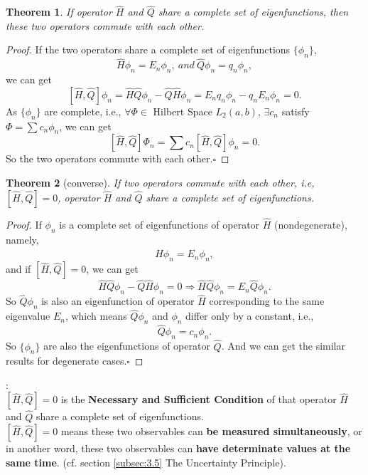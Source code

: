 \documentclass[12pt, 
]{article}
\newtheorem*{thm}{Theorem}
\newtheorem*{proof}{Proof}
\begin{document}
\begin{thm}
	If operator $\hat{H}$ and $\hat{Q}$ share a complete set of eigenfunctions, then these two operators commute with each other.
\end{thm}
\begin{proof}
	If the two operators share a complete set of eigenfunctions $\{\phi_n\}$,
	$$\hat{H}\phi_n=E_n\phi_n,~\textit{and}~\hat{Q}\phi_n=q_n\phi_n,$$
we can get 
	$$[\hat{H},\hat{Q}]\phi_n=\hat{H}\hat{Q}\phi_n-\hat{Q}\hat{H}\phi_n=E_nq_n\phi_n-q_nE_n\phi_n=0.$$
As $\{\phi_n\}$ are complete, i.e., $\forall\varPhi\in$ Hilbert Space $L_2(a,b)$, $\exists c_n$ satisfy $\varPhi=\sum c_n\phi_n$, we can get
	$$[\hat{H},\hat{Q}]\varPhi_n=\sum c_n[\hat{H},\hat{Q}]\phi_n=0.$$
	So the two operators commute with each other.\hfill$\square$

\end{proof}

\begin{thm}[converse]
	If two operators commute with each other, i.e, $[\hat{H}, \hat{Q}]=0$, operator $\hat{H}$ and $\hat{Q}$ share a complete set of eigenfunctions.
\end{thm}
\begin{proof}
	If ${\phi_n}$ is a complete set of eigenfunctions of operator $\hat{H}$ (nondegenerate), namely,
	$$\hat{H}\phi_n=E_n\phi_n,$$
	and if $[\hat{H},\hat{Q}]=0$, we can get
	$$\hat{H}\hat{Q}\phi_n-\hat{Q}\hat{H}\phi_n=0\Rightarrow\hat{H}\hat{Q}\phi_n=E_n\hat{Q}\phi_n.$$
	So $\hat{Q}\phi_n$ is also an eigenfunction of operator $\hat{H}$ corresponding to the same eigenvalue $E_n$, which means $\hat{Q}\phi_n$ and $\phi_n$ differ only by a constant, i.e.,
	$$\hat{Q}\phi_n=c_n\phi_n.$$
	So $\{\phi_n\}$ are also the eigenfunctions of operator $\hat{Q}$. And we can get the similar results for degenerate cases.\hfill$\square$
\end{proof}

:
~\\

$[\hat{H},\hat{Q}]=0$ is the {\bf Necessary and Sufficient Condition} of that operator $\hat{H}$ and $\hat{Q}$ share a complete set of eigenfunctions.
~\\

$[\hat{H},\hat{Q}]=0$ means these two observables can {\bf be measured simultaneously}, or in another word, these two observables can {\bf have determinate values at the same time}. (cf. section \ref{subsec:3.5} The Uncertainty Principle).

\newpage
\end{document}
